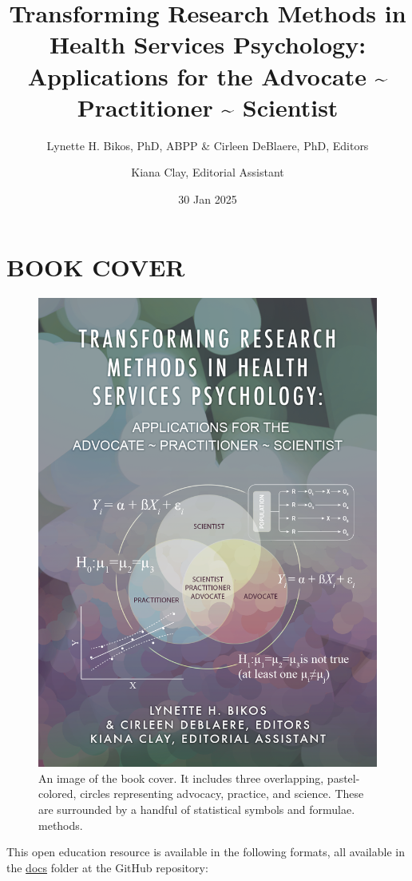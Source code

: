 \documentclass[
  11pt,
]{book}
\title{Transforming Research Methods in Health Services Psychology: Applications for the Advocate \textasciitilde{} Practitioner \textasciitilde{} Scientist}
\author{Lynette H. Bikos, PhD, ABPP \& Cirleen DeBlaere, PhD, Editors \and Kiana Clay, Editorial Assistant}
\date{30 Jan 2025}
\begin{document}
\maketitle

{
\hypersetup{linkcolor=}
\setcounter{tocdepth}{3}
\tableofcontents
}
\chapter*{BOOK COVER}\label{book-cover}


\begin{figure}
\centering
\includegraphics{images/bookcover.png}
\caption{An image of the book cover. It includes three overlapping, pastel-colored, circles representing advocacy, practice, and science. These are surrounded by a handful of statistical symbols and formulae. methods.}
\end{figure}

This open education resource is available in the following formats, all available in the \href{https://github.com/lhbikos/TransformingResearchMethods/tree/main/docs}{docs} folder at the GitHub repository:
\end{document}
